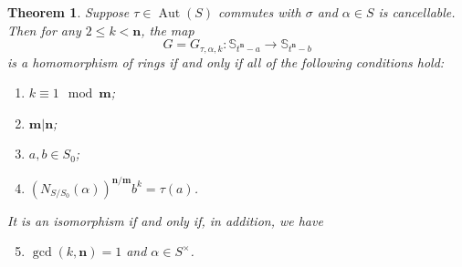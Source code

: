 \documentclass[11pt]{amsart}
\theoremstyle{plain}
\newtheorem{theorem}{Theorem}[section]
\theoremstyle{definition}
\numberwithin{equation}{section}
\numberwithin{figure}{section}
\newcommand{\ring}{S}
\newcommand{\os}{\mathbf{m}}  %
\newcommand{\de}{\mathbf{n}}  %
\DeclareMathOperator{\Aut}{Aut}
\begin{document}
\begin{theorem}\label{prop:G}
    Suppose $\tau\in \Aut(\ring)$ commutes with $\sigma$ and $\alpha \in \ring$ is cancellable.  Then for any $2\leq k < \de$, the map
    $$
    G=G_{\tau,\alpha,k}:\mathbb{S}_{t^\de -a}\to \mathbb{S}_{t^\de -b}
    $$
    is a homomorphism of rings if and only if all of the following conditions hold:
    \begin{enumerate} \setlength{\itemsep}{0pt}
        \item \label{C:k=1} $k\equiv 1 \mod \os$;
        \item \label{C:n|m} $\os|\de$;
        \item \label{C:inF} $a, b\in \ring_0$;
        \item \label{C:norm} $(N_{\ring/\ring_0}(\alpha))^{\de/\os}b^k=\tau(a)$.
    \end{enumerate}
    It is an isomorphism if and only if, in addition, we have
    \begin{enumerate} \setcounter{enumi}{4}
        \item \label{C:relprime} $\gcd(k,\de)=1$ and $\alpha\in \ring^\times$.

    \end{enumerate}
\end{theorem}
\end{document}
